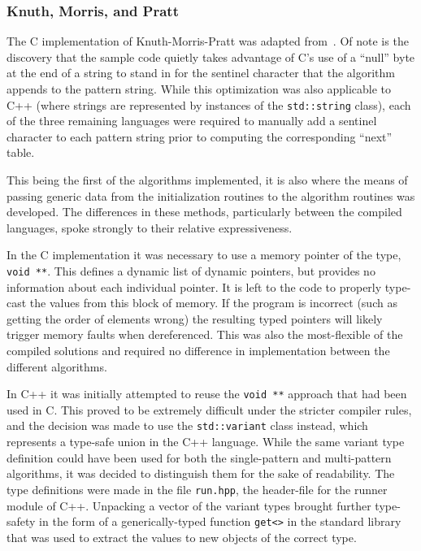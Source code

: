 \subsubsection{Knuth, Morris, and Pratt}

The C implementation of Knuth-Morris-Pratt was adapted from~\cite[Chapter 7]{handbook}. Of note is the discovery that the sample code quietly takes advantage of C's use of a ``null'' byte at the end of a string to stand in for the sentinel character that the algorithm appends to the pattern string. While this optimization was also applicable to C++ (where strings are represented by instances of the \texttt{std::string} class), each of the three remaining languages were required to manually add a sentinel character to each pattern string prior to computing the corresponding ``next'' table.

This being the first of the algorithms implemented, it is also where the means of passing generic data from the initialization routines to the algorithm routines was developed. The differences in these methods, particularly between the compiled languages, spoke strongly to their relative expressiveness.

In the C implementation it was necessary to use a memory pointer of the type, \texttt{void **}. This defines a dynamic list of dynamic pointers, but provides no information about each individual pointer. It is left to the code to properly type-cast the values from this block of memory. If the program is incorrect (such as getting the order of elements wrong) the resulting typed pointers will likely trigger memory faults when dereferenced. This was also the most-flexible of the compiled solutions and required no difference in implementation between the different algorithms.

In C++ it was initially attempted to reuse the \texttt{void **} approach that had been used in C. This proved to be extremely difficult under the stricter compiler rules, and the decision was made to use the \texttt{std::variant} class instead, which represents a type-safe union in the C++ language. While the same variant type definition could have been used for both the single-pattern and multi-pattern algorithms, it was decided to distinguish them for the sake of readability. The type definitions were made in the file \texttt{run.hpp}, the header-file for the runner module of C++. Unpacking a vector of the variant types brought further type-safety in the form of a generically-typed function \texttt{get<>} in the standard library that was used to extract the values to new objects of the correct type.

